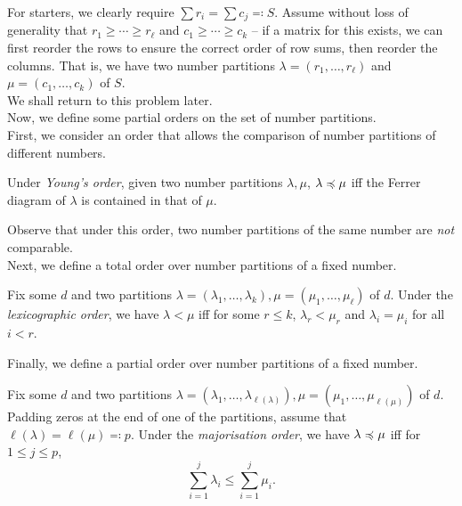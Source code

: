 	For starters, we clearly require $\sum r_i = \sum c_j \eqqcolon S$. Assume without loss of generality that $r_1 \ge \cdots \ge r_\ell$ and $c_1 \ge \cdots \ge c_k$ -- if a matrix for this exists, we can first reorder the rows to ensure the correct order of row sums, then reorder the columns. That is, we have two number partitions $\lambda = (r_1,\ldots,r_\ell)$ and $\mu = (c_1,\ldots,c_k)$ of $S$.\\
	We shall return to this problem later.\\

	Now, we define some partial orders on the set of number partitions.\\
	First, we consider an order that allows the comparison of number partitions of different numbers.
	\begin{fdef}
		Under \emph{Young's order}, given two number partitions $\lambda,\mu$, $\lambda \preccurlyeq \mu$ iff the Ferrer diagram of $\lambda$ is contained in that of $\mu$.
	\end{fdef}
	Observe that under this order, two number partitions of the same number are \emph{not} comparable.\\
	Next, we define a total order over number partitions of a fixed number.
	\begin{fdef}
		Fix some $d$ and two partitions $\lambda = (\lambda_1,\ldots,\lambda_k),\mu = (\mu_1,\ldots,\mu_\ell)$ of $d$. Under the \emph{lexicographic order}, we have $\lambda < \mu$ iff for some $r \le k$, $\lambda_r < \mu_r$ and $\lambda_i = \mu_i$ for all $i < r$.
	\end{fdef}


	Finally, we define a partial order over number partitions of a fixed number.
	\begin{fdef}
		\label{def: majorisation order}
		Fix some $d$ and two partitions $\lambda = (\lambda_1,\ldots,\lambda_{\ell(\lambda)}),\mu = (\mu_1,\ldots,\mu_{\ell(\mu)})$ of $d$. Padding zeros at the end of one of the partitions, assume that $\ell(\lambda) = \ell(\mu) \eqqcolon p$. Under the \emph{majorisation order}, we have $\lambda \preccurlyeq \mu$ iff for $1 \le j \le p$,
		\[ \sum_{i=1}^j \lambda_i \le \sum_{i=1}^j \mu_i. \]
	\end{fdef}


